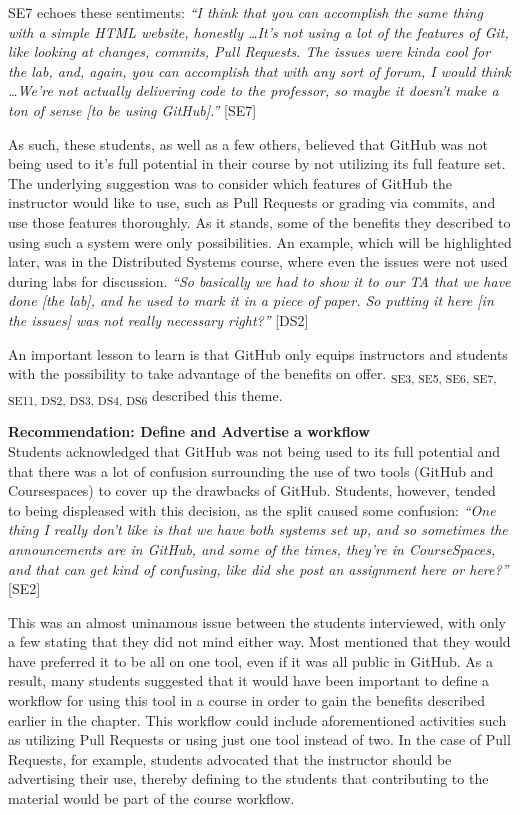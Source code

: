 SE7 echoes these sentiments: \textit{``I think that you can accomplish the same thing with a simple HTML website, honestly \ldots It's not using a lot of the features of Git, like looking at changes, commits, Pull Requests. The issues were kinda cool for the lab, and, again, you can accomplish that with any sort of forum, I would think \ldots We're not actually delivering code to the professor, so maybe it doesn't make a ton of sense [to be using GitHub].''} [SE7]

As such, these students, as well as a few others, believed that GitHub was not being used to it's full potential in their course by not utilizing its full feature set. The underlying suggestion was to consider which features of GitHub the instructor would like to use, such as Pull Requests or grading via commits, and use those features thoroughly. As it stands, some of the benefits they described to using such a system were only possibilities. An example, which will be highlighted later, was in the Distributed Systems course, where even the issues were not used during labs for discussion. \textit{``So basically we had to show it to our TA that we have done [the lab], and he used to mark it in a piece of paper. So putting it here [in the issues] was not really necessary right?''} [DS2]

An important lesson to learn is that GitHub only equips instructors and students with the possibility to take advantage of the benefits on offer. \textsubscript{SE3, SE5, SE6, SE7, SE11, DS2, DS3, DS4, DS6} described this theme.

\textbf{Recommendation: Define and Advertise a workflow} \\
Students acknowledged that GitHub was not being used to its full potential and that there was a lot of confusion surrounding the use of two tools (GitHub and Coursespaces) to cover up the drawbacks of GitHub. Students, however, tended to being displeased with this decision, as the split caused some confusion: \textit{``One thing I really don't like is that we have both systems set up, and so sometimes the announcements are in GitHub, and some of the times, they're in CourseSpaces, and that can get kind of confusing, like did she post an assignment here or here?''} [SE2]

This was an almost uninamous issue between the students interviewed, with only a few stating that they did not mind either way. Most mentioned that they would have preferred it to be all on one tool, even if it was all public in GitHub. As a result, many students suggested that it would have been important to define a workflow for using this tool in a course in order to gain the benefits described earlier in the chapter. This workflow could include aforementioned activities such as utilizing Pull Requests or using just one tool instead of two. In the case of Pull Requests, for example, students advocated that the instructor should be advertising their use, thereby defining to the students that contributing to the material would be part of the course workflow.

